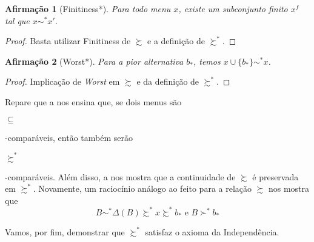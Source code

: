 \documentclass[11pt, a4paper]{article}
\theoremstyle{nonumberplain}
\newtheorem{proof}{Dem.}
\theoremstyle{plain}
\theoremstyle{plain}
\newtheorem{claim}{Afirmação}
\theoremstyle{plain}
\begin{document}

\begin{claim}[Finitiness*]Para todo menu $x$, existe um subconjunto finito $x^f$ tal que $x\sim^* x'$.\end{claim}
\begin{proof}
Basta utilizar Finitiness de $\succsim$ e a definição de $\succsim^*$. 
\end{proof}

\begin{claim}[Worst*] Para a pior alternativa $b_*$, temos $x\cup\{b_*\}\sim^* x$.\end{claim}
\begin{proof}
Implicação de \textit{Worst} em $\succsim$ e da definição de $\succsim^*$. 
\end{proof}



Repare que a  nos ensina que, se dois menus são \begin{small}$\subseteq$\end{small}-comparáveis, então também serão \begin{small}$\succsim^*$\end{small}-comparáveis. Além disso, a  nos mostra que a continuidade de $\succsim$ é preservada em $\succsim^*$. Novamente, um raciocínio análogo ao feito para a relação $\succsim$ nos mostra que \[B\sim^*\Delta(B)\succsim^* x\succsim^* b_* \text{ e } B\succ^* b_*\]

Vamos, por fim, demonstrar que $\succsim^*$ satisfaz o axioma da Independência. 
\end{document}
